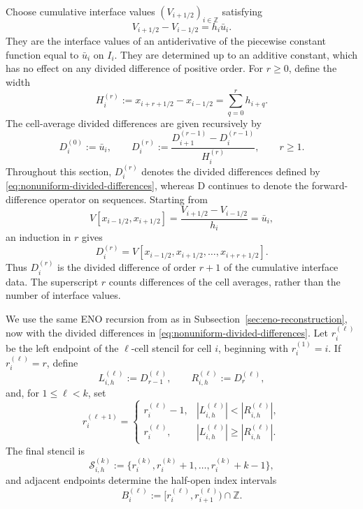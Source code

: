 \documentclass[11pt]{amsart}
\theoremstyle{plain}
\theoremstyle{definition}
\theoremstyle{remark}
\numberwithin{equation}{section}
\theoremstyle{plain}
\begin{document}
Choose cumulative interface values $(V_{i+1/2})_{i\in\mathbb Z}$ satisfying
\begin{equation}\label{eq:nonuniform-primitive}
	V_{i+1/2}-V_{i-1/2}=h_i\bar u_i.
\end{equation}
They are the interface values of an antiderivative of the piecewise
constant function equal to $\bar u_i$ on $I_i$.  They are determined up to an
additive constant, which has no effect on any divided difference of positive
order.  For $r\ge0$, define the width
\begin{equation}\label{eq:nonuniform-window-width}
	H_i^{(r)}
	:=x_{i+r+1/2}-x_{i-1/2}
	=\sum_{q=0}^{r}h_{i+q}.
\end{equation}
The cell-average divided differences are given recursively by
\begin{equation}\label{eq:nonuniform-divided-differences}
	D_i^{(0)}:=\bar u_i,
	\qquad
	D_i^{(r)}
	:=\frac{D_{i+1}^{(r-1)}-D_i^{(r-1)}}{H_i^{(r)}},
	\qquad r\ge1.
\end{equation}
Throughout this section, $D_i^{(r)}$ denotes the divided differences
defined by \eqref{eq:nonuniform-divided-differences}, whereas $\mathrm D$
continues to denote the forward-difference operator on sequences.
Starting from
\[
V[x_{i-1/2},x_{i+1/2}]
=\frac{V_{i+1/2}-V_{i-1/2}}{h_i}
=\bar u_i,
\]
an induction in $r$ gives
\begin{equation}\label{eq:nonuniform-primitive-divided-difference}
	D_i^{(r)}
	=
	V[x_{i-1/2},x_{i+1/2},\ldots,x_{i+r+1/2}].
\end{equation}
Thus $D_i^{(r)}$ is the divided difference of order $r+1$ of the cumulative
interface data.  The superscript $r$ counts differences of the cell averages,
rather than the number of interface values.

We use the same ENO recursion from \cite{FMT} as in
Subsection~\ref{sec:eno-reconstruction}, now with the divided differences in
\eqref{eq:nonuniform-divided-differences}.  Let $r_i^{(\ell)}$ be the left
endpoint of the $\ell$-cell stencil for cell $i$, beginning with
$r_i^{(1)}=i$.  If $r_i^{(\ell)}=r$, define
\[
L_{i,h}^{(\ell)}:=D_{r-1}^{(\ell)},
\qquad
R_{i,h}^{(\ell)}:=D_r^{(\ell)},
\]
and, for $1\le\ell<k$, set
\begin{equation}\label{eq:nonuniform-endpoint-recursion}
	r_i^{(\ell+1)}
	=
	\begin{cases}
		r_i^{(\ell)}-1,
		& |L_{i,h}^{(\ell)}|<|R_{i,h}^{(\ell)}|,\\[2mm]
		r_i^{(\ell)},
		& |L_{i,h}^{(\ell)}|\ge |R_{i,h}^{(\ell)}|.
	\end{cases}
\end{equation}
The final stencil is
\[
\mathcal S_{i,h}^{(k)}
:=
\{r_i^{(k)},r_i^{(k)}+1,\ldots,r_i^{(k)}+k-1\},
\]
and adjacent endpoints determine the half-open index intervals
\begin{equation}\label{eq:nonuniform-selected-index-interval}
	B_i^{(\ell)}
	:=
	[r_i^{(\ell)},r_{i+1}^{(\ell)})\cap\mathbb Z.
\end{equation}
\end{document}
